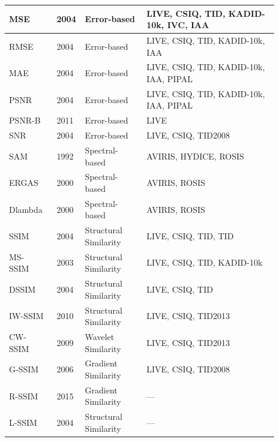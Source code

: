 \begin{longtable}{
p{0.15\linewidth}  %
p{0.05\linewidth}  %
p{0.22\linewidth}  %
p{0.47\linewidth}  %
}
    \acs{MSE}~\cite{wang2004image} & 2004 & Error-based & \acs{LIVE}, \acs{CSIQ}, \acs{TID}, \acs{KADID-10k}, \acs{IVC}, \acs{IAA}\\ \hline
    \acs{RMSE}~\cite{wang2004image} & 2004 & Error-based & \acs{LIVE}, \acs{CSIQ}, \acs{TID}, \acs{KADID-10k}, \acs{IAA} \\ \hline
    \acs{MAE}~\cite{wang2004image} & 2004 & Error-based & \acs{LIVE}, \acs{CSIQ}, \acs{TID},  \acs{KADID-10k}, \acs{IAA}, \acs{PIPAL} \\ \hline
    \acs{PSNR}~\cite{wang2004image} & 2004 & Error-based & \acs{LIVE}, \acs{CSIQ}, \acs{TID},  \acs{KADID-10k}, \acs{IAA}, \acs{PIPAL} \\ \hline
    \acs{PSNR-B}~\cite{ma2011psnrb} & 2011 & Error-based & \acs{LIVE} \\ \hline
    \acs{SNR}~\cite{wang2004image} & 2004 & Error-based & \acs{LIVE}, \acs{CSIQ}, \acs{TID}2008 \\ \hline
    \acs{SAM}~\cite{yuhas1992sam} & 1992 & Spectral-based & \acs{AVIRIS}, \acs{HYDICE}, \acs{ROSIS} \\ \hline
    \acs{ERGAS}~\cite{wald2000ergas} & 2000 & Spectral-based & \acs{AVIRIS}, \acs{ROSIS} \\ \hline
    \acs{Dlambda}~\cite{wald2000ergas} & 2000 & Spectral-based & \acs{AVIRIS}, \acs{ROSIS} \\ \hline
    \acs{SSIM}~\cite{wang2004image} & 2004 & Structural Similarity & \acs{LIVE}, \acs{CSIQ}, \acs{TID}, \acs{TID} \\ \hline
    \acs{MS-SSIM}~\cite{wang2003multiscale} & 2003 & Structural Similarity & \acs{LIVE}, \acs{CSIQ}, \acs{TID}, \acs{KADID-10k} \\ \hline
    \acs{DSSIM}~\cite{wang2004image} & 2004 & Structural Similarity & \acs{LIVE}, \acs{CSIQ}, \acs{TID} \\ \hline
    \acs{IW-SSIM}~\cite{li2011iwssim} & 2010 & Structural Similarity & \acs{LIVE}, \acs{CSIQ}, \acs{TID}2013 \\ \hline
    \acs{CW-SSIM}~\cite{sampat2009cwssim} & 2009 & Wavelet Similarity & \acs{LIVE}, \acs{CSIQ}, \acs{TID}2013 \\ \hline
    \acs{G-SSIM}~\cite{chen2006gssim} & 2006 & Gradient Similarity & \acs{LIVE}, \acs{CSIQ}, \acs{TID}2008 \\ \hline
    \acs{R-SSIM}~\cite{yan2015rssim} & 2015 & Gradient Similarity & --- \\ \hline
    \acs{L-SSIM}~\cite{wang2004image} & 2004 & Structural Similarity & --- \\ \hline

\end{longtable}
